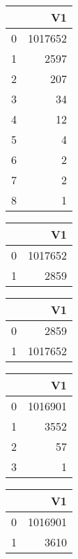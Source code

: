 \bigskip\bigskip
\centering
\begin{tabular}{rr}
  \hline
 & V1 \\ 
  \hline
0 & 1017652 \\ 
  1 & 2597 \\ 
  2 & 207 \\ 
  3 &  34 \\ 
  4 &  12 \\ 
  5 &   4 \\ 
  6 &   2 \\ 
  7 &   2 \\ 
  8 &   1 \\ 
   \hline
\end{tabular}

\bigskip\bigskip
\centering
\begin{tabular}{rr}
  \hline
 & V1 \\ 
  \hline
0 & 1017652 \\ 
  1 & 2859 \\ 
   \hline
\end{tabular}

\bigskip\bigskip
\centering
\begin{tabular}{rr}
  \hline
 & V1 \\ 
  \hline
0 & 2859 \\ 
  1 & 1017652 \\ 
   \hline
\end{tabular}

\bigskip\bigskip
\centering
\begin{tabular}{rr}
  \hline
 & V1 \\ 
  \hline
0 & 1016901 \\ 
  1 & 3552 \\ 
  2 &  57 \\ 
  3 &   1 \\ 
   \hline
\end{tabular}

\bigskip\bigskip
\centering
\begin{tabular}{rr}
  \hline
 & V1 \\ 
  \hline
0 & 1016901 \\ 
  1 & 3610 \\ 
   \hline
\end{tabular}

